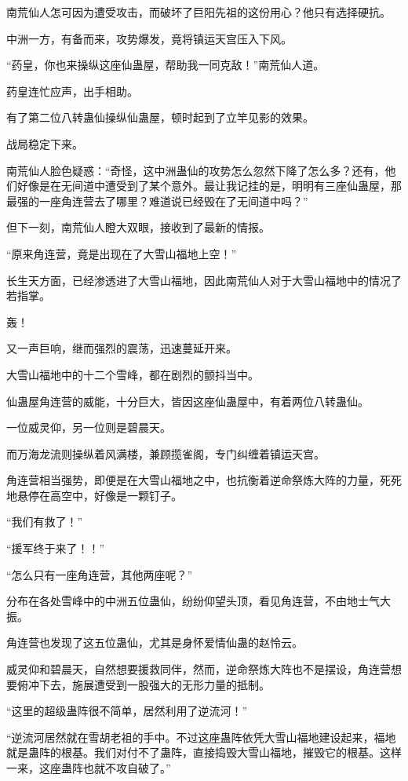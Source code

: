 \begin{this_body}
南荒仙人怎可因为遭受攻击，而破坏了巨阳先祖的这份用心？他只有选择硬抗。

中洲一方，有备而来，攻势爆发，竟将镇运天宫压入下风。

“药皇，你也来操纵这座仙蛊屋，帮助我一同克敌！”南荒仙人道。

药皇连忙应声，出手相助。

有了第二位八转蛊仙操纵仙蛊屋，顿时起到了立竿见影的效果。

战局稳定下来。

南荒仙人脸色疑惑：“奇怪，这中洲蛊仙的攻势怎么忽然下降了怎么多？还有，他们好像是在无间道中遭受到了某个意外。最让我记挂的是，明明有三座仙蛊屋，那最强的一座角连营去了哪里？难道说已经毁在了无间道中吗？”

但下一刻，南荒仙人瞪大双眼，接收到了最新的情报。

“原来角连营，竟是出现在了大雪山福地上空！”

长生天方面，已经渗透进了大雪山福地，因此南荒仙人对于大雪山福地中的情况了若指掌。

轰！

又一声巨响，继而强烈的震荡，迅速蔓延开来。

大雪山福地中的十二个雪峰，都在剧烈的颤抖当中。

仙蛊屋角连营的威能，十分巨大，皆因这座仙蛊屋中，有着两位八转蛊仙。

一位威灵仰，另一位则是碧晨天。

而万海龙流则操纵着风满楼，兼顾揽雀阁，专门纠缠着镇运天宫。

角连营相当强势，即便是在大雪山福地之中，也抗衡着逆命祭炼大阵的力量，死死地悬停在高空中，好像是一颗钉子。

“我们有救了！”

“援军终于来了！！”

“怎么只有一座角连营，其他两座呢？”

分布在各处雪峰中的中洲五位蛊仙，纷纷仰望头顶，看见角连营，不由地士气大振。

角连营也发现了这五位蛊仙，尤其是身怀爱情仙蛊的赵怜云。

威灵仰和碧晨天，自然想要援救同伴，然而，逆命祭炼大阵也不是摆设，角连营想要俯冲下去，施展遭受到一股强大的无形力量的抵制。

“这里的超级蛊阵很不简单，居然利用了逆流河！”

“逆流河居然就在雪胡老祖的手中。不过这座蛊阵依凭大雪山福地建设起来，福地就是蛊阵的根基。我们对付不了蛊阵，直接捣毁大雪山福地，摧毁它的根基。这样一来，这座蛊阵也就不攻自破了。”


\end{this_body}
